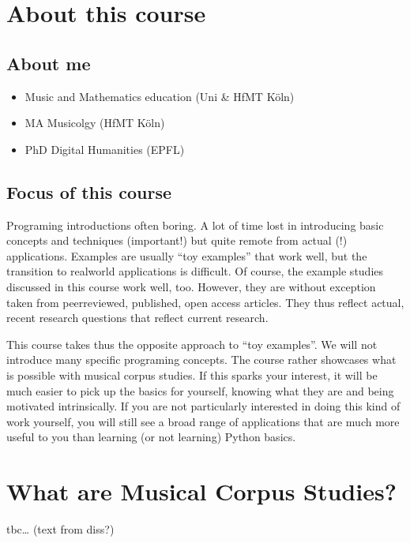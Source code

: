 \documentclass[letterpaper,10pt,english]{sphinxmanual}
\begin{document}
\section{About this course}
\label{\detokenize{2_introduction:about-this-course}}

\subsection{About me}
\label{\detokenize{2_introduction:about-me}}\begin{itemize}
\item {} 
Music and Mathematics education (Uni \& HfMT Köln)

\item {} 
MA Musicolgy (HfMT Köln)

\item {} 
PhD Digital Humanities (EPFL)

\end{itemize}


\subsection{Focus of this course}
\label{\detokenize{2_introduction:focus-of-this-course}}
Programing introductions often boring.
A lot of time lost in introducing basic concepts and techniques (important!)
but quite remote from actual (!) applications. Examples are usually “toy examples”
that work well, but the transition to real\sphinxhyphen{}world applications is difficult.
Of course, the example studies discussed in this course work well, too.
However, they are without exception taken from peer\sphinxhyphen{}reviewed, published, open access articles.
They thus reflect actual, recent research questions that reflect current research.

This course takes thus the opposite approach to “toy examples”. We will not introduce many specific
programing concepts. The course rather showcases what is possible with musical corpus studies.
If this sparks your interest, it will be much easier to pick up the basics for yourself,
knowing what they are  and being motivated intrinsically.
If you are not particularly interested in doing this kind of work yourself,
you will still see a broad range of applications that are much more useful to you than
learning (or not learning) Python basics.


\section{What are Musical Corpus Studies?}
\label{\detokenize{2_introduction:what-are-musical-corpus-studies}}
tbc… (text from diss?)
\end{document}

